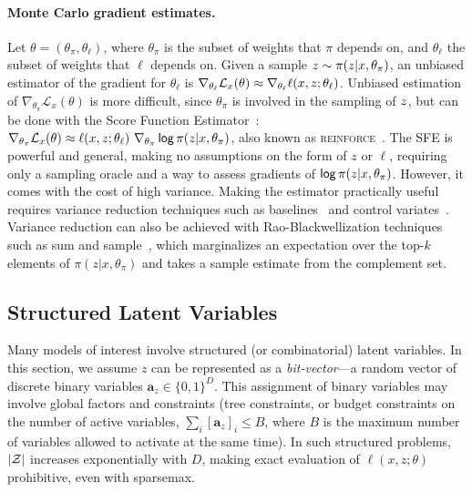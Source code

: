 \paragraph*{Monte Carlo gradient estimates.} Let $\theta=(\theta_\pi,
        \theta_\ell)$, where $\theta_\pi$ is the subset of weights that $\pi$
depends on, and $\theta_\ell$ the subset of weights that $\ell$
depends on. Given a sample $z \sim \pi(z| x,\theta_\pi)$, an
unbiased estimator of the gradient for  \wrt
$\theta_\ell$ is $\nabla_{\theta_\ell} \mathcal L_x(\theta) \approx
        \nabla_{\theta_\ell} \ell(x, z; \theta_\ell)$. Unbiased
estimation of $\nabla_{\theta_\pi} \mathcal L_x(\theta)$ is more
difficult, since $\theta_\pi$ is involved in the sampling of
$z$, but can be done with the Score Function
Estimator~\citep[SFE;][]{rubinstein1976monte,paisley2012variational}:
$\nabla_{\theta_\pi} \mathcal L_x(\theta) \approx \ell(x, z;
        \theta_\ell) ~ \nabla_{\theta_\pi} \operatorname*{\mathsf{log}} \pi(z | x, \theta_\pi)$,
also known as \textsc{reinforce}~\citep{Williams1992}. The SFE is
powerful and general, making no assumptions on the form of $z$ or
$\ell$, requiring only a sampling oracle and a way to assess
gradients of $\operatorname*{\mathsf{log}} \pi(z | x, \theta_\pi)$. However, it comes
with the cost of high variance. Making the estimator practically
useful requires variance reduction techniques such as
baselines~\citep{Williams1992,MuProp} and control
variates~\citep{CV2013,REBAR,RELAX}. Variance reduction can also be
achieved with Rao-Blackwellization techniques such as sum and
sample~\citep{casella1996rao,BBVI14,RB19}, which marginalizes an
expectation over the top-$k$ elements of $\pi(z| x,\theta_\pi)$ and
takes a sample estimate from the complement set.

\subsection{Structured Latent Variables}\label{sec:struct_lvm_bg}

Many models of interest involve structured (or combinatorial) latent
variables. In this section, we assume $z$ can be represented as a
        {\it bit-vector}---\ie a random vector of discrete binary variables
$\bm{a}_{z} \in \{0, 1\}^D$. This assignment of binary variables may
involve global factors and constraints (\eg tree constraints, or
budget constraints on the number of active variables, \ie $\sum_i
        [\bm{a}_{z}]_i \le B$, where $B$ is the maximum number of variables
allowed to activate at the same time). In such structured problems,
$|\mathcal{Z}|$ increases exponentially with $D$, making exact evaluation of
$\ell(x, z; \theta)$ prohibitive, even with sparsemax.


